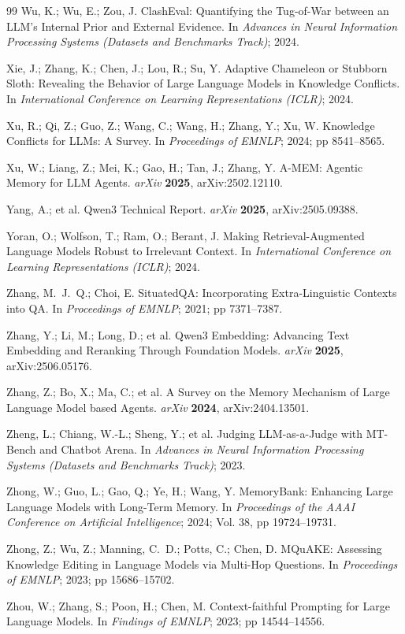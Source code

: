 \documentclass[journal=jcisd8,manuscript=article]{achemso}
\begin{document}
\begin{thebibliography}{99}
 Wu, K.; Wu, E.; Zou, J. ClashEval: Quantifying the Tug-of-War between an LLM's Internal Prior and External Evidence. In \emph{Advances in Neural Information Processing Systems (Datasets and Benchmarks Track)}; 2024.

 Xie, J.; Zhang, K.; Chen, J.; Lou, R.; Su, Y. Adaptive Chameleon or Stubborn Sloth: Revealing the Behavior of Large Language Models in Knowledge Conflicts. In \emph{International Conference on Learning Representations (ICLR)}; 2024.

 Xu, R.; Qi, Z.; Guo, Z.; Wang, C.; Wang, H.; Zhang, Y.; Xu, W. Knowledge Conflicts for LLMs: A Survey. In \emph{Proceedings of EMNLP}; 2024; pp 8541--8565.

 Xu, W.; Liang, Z.; Mei, K.; Gao, H.; Tan, J.; Zhang, Y. A-MEM: Agentic Memory for LLM Agents. \emph{arXiv} \textbf{2025}, arXiv:2502.12110.

 Yang, A.; et al. Qwen3 Technical Report. \emph{arXiv} \textbf{2025}, arXiv:2505.09388.

 Yoran, O.; Wolfson, T.; Ram, O.; Berant, J. Making Retrieval-Augmented Language Models Robust to Irrelevant Context. In \emph{International Conference on Learning Representations (ICLR)}; 2024.

 Zhang, M.~J.~Q.; Choi, E. SituatedQA: Incorporating Extra-Linguistic Contexts into QA. In \emph{Proceedings of EMNLP}; 2021; pp 7371--7387.

 Zhang, Y.; Li, M.; Long, D.; et al. Qwen3 Embedding: Advancing Text Embedding and Reranking Through Foundation Models. \emph{arXiv} \textbf{2025}, arXiv:2506.05176.

 Zhang, Z.; Bo, X.; Ma, C.; et al. A Survey on the Memory Mechanism of Large Language Model based Agents. \emph{arXiv} \textbf{2024}, arXiv:2404.13501.

 Zheng, L.; Chiang, W.-L.; Sheng, Y.; et al. Judging LLM-as-a-Judge with MT-Bench and Chatbot Arena. In \emph{Advances in Neural Information Processing Systems (Datasets and Benchmarks Track)}; 2023.

 Zhong, W.; Guo, L.; Gao, Q.; Ye, H.; Wang, Y. MemoryBank: Enhancing Large Language Models with Long-Term Memory. In \emph{Proceedings of the AAAI Conference on Artificial Intelligence}; 2024; Vol. 38, pp 19724--19731.

 Zhong, Z.; Wu, Z.; Manning, C.~D.; Potts, C.; Chen, D. MQuAKE: Assessing Knowledge Editing in Language Models via Multi-Hop Questions. In \emph{Proceedings of EMNLP}; 2023; pp 15686--15702.

 Zhou, W.; Zhang, S.; Poon, H.; Chen, M. Context-faithful Prompting for Large Language Models. In \emph{Findings of EMNLP}; 2023; pp 14544--14556.

\end{thebibliography}
\end{document}
